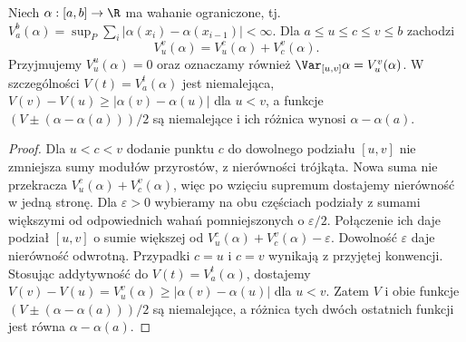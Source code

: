 \begin{lemat}\label{it:lem:rs-variation}\label{ma1:kh:lem:variation-additivity}
Niech $\alpha:[a,b]\to\R$ ma wahanie ograniczone, tj. $V_a^b(\alpha)=\sup_P\sum_i|\alpha(x_i)-\alpha(x_{i-1})|<\infty$. Dla $a\le u\le c\le v\le b$ zachodzi
\[
V_u^v(\alpha)=V_u^c(\alpha)+V_c^v(\alpha).
\]
Przyjmujemy $V_u^u(\alpha)=0$ oraz oznaczamy również $\Var_{[u,v]}\alpha=V_u^v(\alpha)$. W szczególności $V(t)=V_a^t(\alpha)$ jest niemalejąca, $V(v)-V(u)\ge|\alpha(v)-\alpha(u)|$ dla $u<v$, a funkcje $(V\pm(\alpha-\alpha(a)))/2$ są niemalejące i ich różnica wynosi $\alpha-\alpha(a)$.
\end{lemat}
\begin{proof}
Dla $u<c<v$ dodanie punktu $c$ do dowolnego podziału $[u,v]$ nie zmniejsza sumy modułów przyrostów, z nierówności trójkąta. Nowa suma nie przekracza $V_u^c(\alpha)+V_c^v(\alpha)$, więc po wzięciu supremum dostajemy nierówność w jedną stronę. Dla $\varepsilon>0$ wybieramy na obu częściach podziały z sumami większymi od odpowiednich wahań pomniejszonych o $\varepsilon/2$. Połączenie ich daje podział $[u,v]$ o sumie większej od $V_u^c(\alpha)+V_c^v(\alpha)-\varepsilon$. Dowolność $\varepsilon$ daje nierówność odwrotną. Przypadki $c=u$ i $c=v$ wynikają z przyjętej konwencji.
 Stosując addytywność do $V(t)=V_a^t(\alpha)$, dostajemy $V(v)-V(u)=V_u^v(\alpha)\ge|\alpha(v)-\alpha(u)|$ dla $u<v$. Zatem $V$ i obie funkcje $(V\pm(\alpha-\alpha(a)))/2$ są niemalejące, a różnica tych dwóch ostatnich funkcji jest równa $\alpha-\alpha(a)$.
\end{proof}

